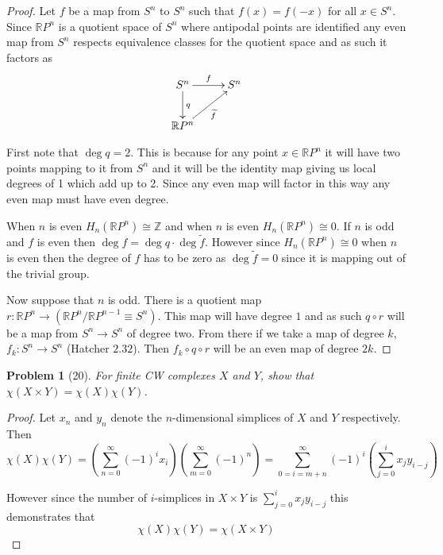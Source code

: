 \documentclass[10pt]{article}
\newcommand{\sk}{\vskip 10mm}
\newcommand{\bb}[1]{\mathbb{#1}}
\theoremstyle{plain}
\newtheorem{problem}{Problem}
\theoremstyle{remark}
\begin{document}
\begin{proof}
    Let $f$ be a map from $S^n$ to $S^n$ such that $f(x)=f(-x)$ for all $x\in S^n$.
  Since $\bb{R}P^n$ is a quotient space of $S^n$ where antipodal points are
  identified any even map from $S^n$ respects equivalence classes for the
  quotient space and as such it factors as
  \[
    \xymatrix{
      S^n \ar[d]^q \ar[r]^f & S^n\\
      \bb{R}P^n \ar[ru]_{\widetilde{f}}
    }
  \]

  First note that $\deg q =2$. This is because
  for any point $x\in\bb{R}P^n$ it will have two points mapping to it from $S^n$ and
  it will be the identity map giving us local degrees of 1 which add up to 2. Since
  any even map will factor in this way any even map must have even degree.
  
  When $n$ is even $H_n(\bb{R}P^n)\cong\bb{Z}$ and when $n$ is even $H_n(\bb{R}P^n)\cong 0$.
  If $n$ is odd and $f$ is even then $\deg f = \deg q\cdot\deg \widetilde{f}$. However
  since $H_n(\bb{R}P^n)\cong 0$ when $n$ is even then the degree of $f$ has to be zero
  as $\deg \widetilde{f}=0$ since it is mapping out of the trivial group.

  Now suppose that $n$ is odd. There is a quotient map
  $r:\bb{R}P^n\rightarrow (\bb{R}P^n/\bb{R}P^{n-1}\equiv S^n)$. This map will have degree $1$ and
  as such $q\circ r$ will be a map from $S^n\rightarrow S^n$ of degree two. From there if we
  take a map of degree $k$, $f_k:S^n\rightarrow S^n$ (Hatcher $2.32$). Then $f_k\circ q\circ r$ will be
  an even map of degree $2k$.
\end{proof}

\sk

\begin{problem}[20]
  For finite CW complexes $X$ and $Y$, show that
  $\chi(X\times Y)=\chi(X)\chi(Y)$.
\end{problem}

\begin{proof}
  Let $x_n$ and $y_n$ denote the $n$-dimensional simplices of $X$ and $Y$
  respectively. Then
  \[
    \chi(X)\chi(Y)=\left(\sum_{n=0}^\infty(-1)^ix_i\right)\left(\sum_{m=0}^\infty(-1)^n\right)=\sum_{0=i=m+n}^\infty(-1)^{i}\left(\sum_{j=0}^ix_jy_{i-j}\right)
  \]

  However since the number of $i$-simplices in $X\times Y$ is $\sum_{j=0}^ix_jy_{i-j}$
  this demonstrates that
  \[
    \chi(X)\chi(Y)=\chi(X\times Y)
  \]
\end{proof}

\sk

\end{document}
